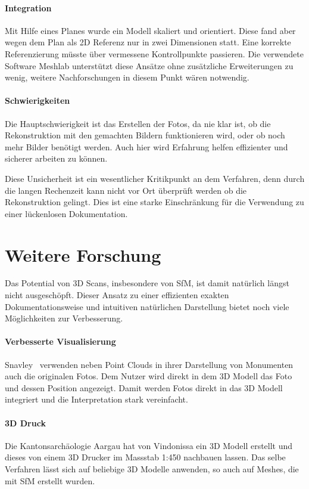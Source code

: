		\paragraph{Integration}
			Mit Hilfe eines Planes wurde ein Modell skaliert und orientiert. Diese fand aber wegen dem Plan als 2D Referenz nur in zwei Dimensionen statt. Eine korrekte Referenzierung müsste über vermessene Kontrollpunkte passieren.
			Die verwendete Software Meshlab unterstützt diese Ansätze ohne zusätzliche Erweiterungen zu wenig, weitere Nachforschungen in diesem Punkt wären notwendig.
			
		\paragraph{Schwierigkeiten}
			Die Hauptschwierigkeit ist das Erstellen der Fotos, da nie klar ist, ob die Rekonstruktion mit den gemachten Bildern funktionieren wird, oder ob noch mehr Bilder benötigt werden. Auch hier wird Erfahrung helfen effizienter und sicherer arbeiten zu können.
			
			Diese Unsicherheit ist ein wesentlicher Kritikpunkt an dem Verfahren, denn durch die langen Rechenzeit kann nicht vor Ort überprüft werden ob die Rekonstruktion gelingt. Dies ist eine starke Einschränkung für die Verwendung zu einer lückenlosen Dokumentation.
				
	\section{Weitere Forschung}
		Das Potential von 3D Scans, insbesondere von SfM, ist damit natürlich längst nicht ausgeschöpft. Dieser Ansatz zu einer effizienten exakten Dokumentationsweise und intuitiven natürlichen Darstellung bietet noch viele Möglichkeiten zur Verbesserung.
		
		\paragraph{Verbesserte Visualisierung}
			Snavley \etal\ verwenden neben Point Clouds in ihrer Darstellung von Monumenten auch die originalen Fotos. Dem Nutzer wird direkt in dem 3D Modell das Foto und dessen Position angezeigt. Damit werden Fotos direkt in das 3D Modell integriert und die Interpretation stark vereinfacht.
			
		\paragraph{3D Druck}
			Die Kantonsarchäologie Aargau hat von Vindonissa ein 3D Modell erstellt und dieses von einem 3D Drucker im Massstab 1:450 nachbauen lassen. Das selbe Verfahren lässt sich auf beliebige 3D Modelle anwenden, so auch auf Meshes, die mit SfM erstellt wurden.
			
